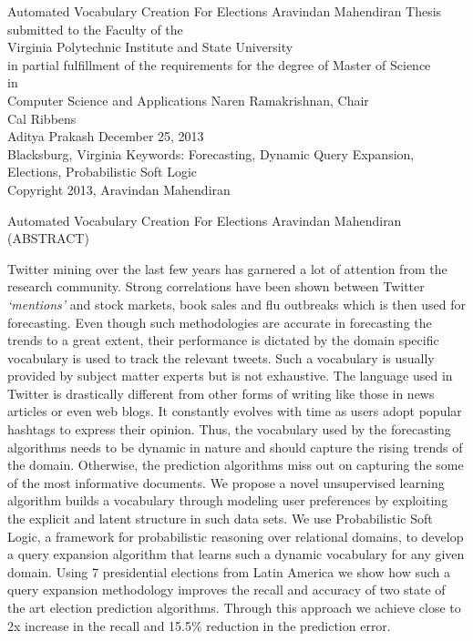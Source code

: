 \documentclass[12pt]{report}
\begin{document}
\thispagestyle{empty}

\begin{center}
{\Large 
Automated Vocabulary Creation For Elections
}
\vfill
Aravindan Mahendiran
\vfill
Thesis submitted to the Faculty of the \\
Virginia Polytechnic Institute and State University \\
in partial fulfillment of the requirements for the degree of
\vfill
Master of Science \\
in \\
Computer Science and Applications
\vfill
Naren Ramakrishnan, Chair \\
Cal Ribbens \\
Aditya Prakash
\vfill
December 25, 2013 \\
Blacksburg, Virginia
\vfill
Keywords: Forecasting, Dynamic Query Expansion, Elections, Probabilistic Soft Logic \\
Copyright 2013, Aravindan Mahendiran
\end{center}
\pagebreak
\thispagestyle{empty}

\begin{center}
{\large Automated Vocabulary Creation For Elections}
\vfill
Aravindan Mahendiran
\vfill
(ABSTRACT)
\vfill
\end{center}
Twitter mining over the last few years has garnered a lot of attention from the research community. 
Strong correlations have been shown between Twitter \emph{‘mentions’} and stock markets, book sales and flu outbreaks which is then used for forecasting.
Even though such methodologies are accurate in forecasting the trends to a great extent, their performance is dictated by the domain specific vocabulary is used to track the relevant tweets. 
Such a vocabulary is usually provided by subject matter experts but is not exhaustive.
The language used in Twitter is drastically different from other forms of writing like those in news articles or even web blogs.  
It constantly evolves with time as users adopt popular hashtags to express their opinion.
Thus, the vocabulary used by the forecasting algorithms needs to be dynamic in nature and should capture the rising trends of the domain. 
Otherwise, the prediction algorithms miss out on capturing the some of the most informative documents.
\newline 
We propose a novel unsupervised learning algorithm builds a vocabulary through modeling user preferences by exploiting the explicit and latent structure in such data sets.
We use Probabilistic Soft Logic, a framework for probabilistic reasoning over relational domains, to develop a query expansion algorithm that learns such a dynamic vocabulary for any given domain.  
Using 7 presidential elections from Latin America we show how such a query expansion methodology improves the recall and accuracy of two state of the art election prediction algorithms. 
Through this approach we achieve close to 2x increase in the recall and 15.5\% reduction in the prediction error. 
\pagebreak
\end{document}
